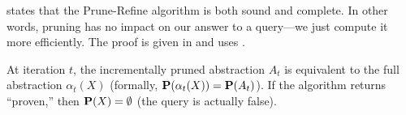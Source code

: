  states that the Prune-Refine algorithm is both
sound and complete.  In other words, pruning has no impact on our answer to a
query---we just compute it more efficiently.
The proof is given in  and uses .

\begin{theorem}
\label{thm:algorithm}
At iteration $t$,
the incrementally pruned abstraction $A_t$ is equivalent
to the full abstraction $\alpha_t(X)$ (formally, $\mathbf{P}(\alpha_t(X)) = \mathbf{P}(A_t)$).
If the algorithm returns ``proven,'' then $\mathbf{P}(X) = \emptyset$ (the query is actually false).
\end{theorem}

